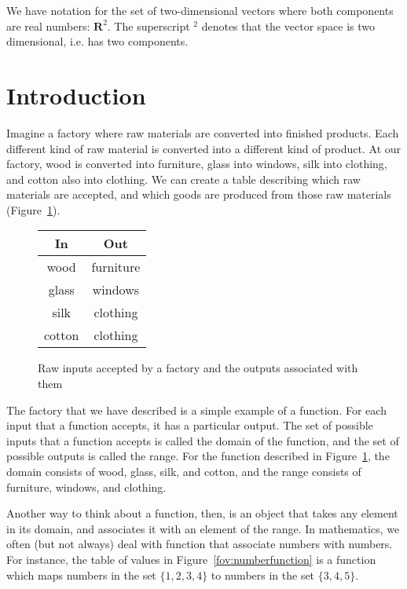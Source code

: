 \documentclass[a4paper,10pt]{report}
\begin{document}
We have notation for the set of two-dimensional vectors where both components are real
numbers: \(\mathbf{R}^2\). The superscript \(^2\) denotes that the vector space is two
dimensional, i.e. has two components.

\section{Introduction}

Imagine a factory where raw materials are converted into finished products.
Each different kind of raw material is converted into a different kind of
product. At our factory, wood is converted into furniture, glass into windows,
silk into clothing, and cotton also into clothing. We can create a table
describing which raw materials are accepted, and which goods are produced from
those raw materials (Figure~\ref{fov:factory}).

\begin{figure}
 \renewcommand{\arraystretch}{1.2}
 \begin{tabular}{|c|c|}
  \hline
  \textbf{In} & \textbf{Out} \\
  \hline
  wood & furniture \\
  glass & windows \\
  silk & clothing \\
  cotton & clothing \\
  \hline
 \end{tabular}

 \caption{Raw inputs accepted by a factory and the outputs associated with
 them}
 \label{fov:factory}
\end{figure}

The factory that we have described is a simple example of a \gls{function}. For each input
that a function accepts, it has a particular output. The set of possible inputs that a
function accepts is called the \gls{domain} of the function, and the set of possible outputs
is called the \gls{range}. For the function described in Figure~\ref{fov:factory}, the
domain consists of wood, glass, silk, and cotton, and the range consists of furniture,
windows, and clothing.

Another way to think about a function, then, is an object that takes any element in its
domain, and associates it with an element of the range. In mathematics, we often (but not
always) deal with function that associate numbers with numbers. For instance, the table of
values in Figure~\ref{fov:numberfunction} is a function which maps numbers in the set \(\{1,
2, 3, 4\}\) to numbers in the set \(\{3, 4, 5\}\).
\end{document}
